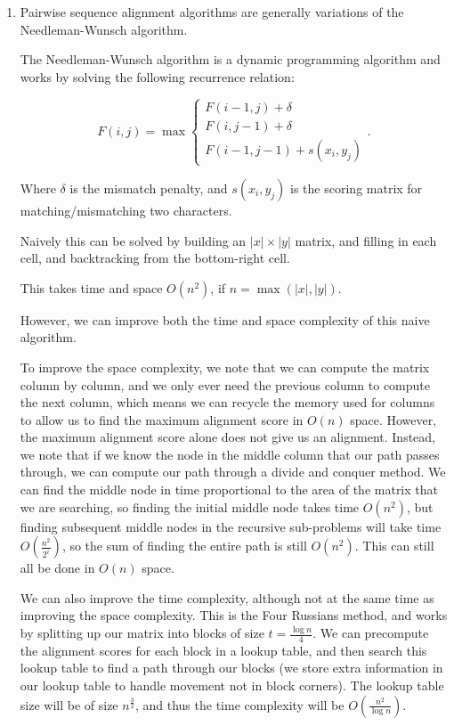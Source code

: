 


\begin{enumerate}[label=(\alph*)]
  \item
    Pairwise sequence alignment algorithms are generally variations of the Needleman-Wunsch algorithm.

    The Needleman-Wunsch algorithm is a dynamic programming algorithm and works by solving the following recurrence relation:

    \[
      F(i,j) = \max\begin{cases}F(i-1, j) + \delta\\F(i, j-1) + \delta\\F(i-1,j-1) + s(x_i, y_j)\end{cases}
    .\] 

    Where $\delta$ is the mismatch penalty, and $s(x_i, y_j)$ is the scoring matrix for matching/mismatching two characters.

    Naively this can be solved by building  an $|x| \times |y|$ matrix, and filling in each cell, and backtracking from the bottom-right cell.

    This takes time and space $O(n^2)$, if $n = \max(|x|, |y|)$.

    However, we can improve both the time and space complexity of this naive algorithm.

    To improve the space complexity, we note that we can compute the matrix column by column, and we only ever need the previous column to compute the next column, which means we can recycle the memory used for columns to allow us to find the maximum alignment score in $O(n)$ space. However, the maximum alignment score alone does not give us an alignment. Instead, we note that if we know the node in the middle column that our path passes through, we can compute our path through a divide and conquer method. We can find the middle node in time proportional to the area of the matrix that we are searching, so finding the initial middle node takes time $O(n^2)$, but finding subsequent middle nodes in the recursive sub-problems will take time $O(\frac{n^2}{2^i})$, so the sum of finding the entire path is still $O(n^2)$. This can still all be done in $O(n)$ space.

    We can also improve the time complexity, although not at the same time as improving the space complexity. This is the Four Russians method, and works by splitting up our matrix into blocks of size $t = \frac{\log n}{4}$. We can precompute the alignment scores for each block in a lookup table, and then search this lookup table to find a path through our blocks (we store extra information in our lookup table to handle movement not in block corners). The lookup table size will be of size $n^{\frac{3}{2}}$, and thus the time complexity will be $O(\frac{n^2}{\log n})$.


\end{enumerate}
